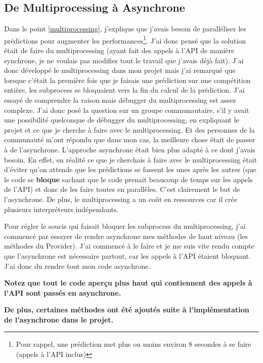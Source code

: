 \documentclass[a4paper,14pt]{extarticle}
\begin{document}
{\subsection{De Multiprocessing à Asynchrone}
\label{multiprocessingToAsync}

Dans le point \ref{multiprocessing}, j'explique que j'avais besoin de paralléliser les prédictions pour augmenter les performances\footnote{Pour rappel, une prédiction met plus ou moins environ 8 secondes à se faire (appels à l'API inclus) }. J'ai donc pensé que la solution était de faire du multiprocessing (ayant fait des appels à l'API de manière synchrone, je ne voulais pas modifier tout le travail que j'avais déjà fait). J'ai donc développé le multiprocessing dans mon projet mais j'ai remarqué que lorsque c'était la première fois que je faisais une prédiction sur une compétition entière, les subprocess se bloquaient vers la fin du calcul de la prédiction. J'ai essayé de comprendre la raison mais débugger du multiprocessing est assez complexe. J'ai donc posé la question sur un groupe communautaire, s'il y avait une possibilité quelconque de débugger du multiprocessing, en expliquant le projet et ce que je cherche à faire avec le multiprocessing. Et des personnes de la communauté m'ont répondu que dans mon cas, la meilleure chose était de passer à de l'asynchrone. L'approche asynchrone était bien plus adapté à ce dont j'avais besoin. En effet, en réalité ce que je cherchais à faire avec le multiprocessing était d'éviter qu'on attende que les prédictions se fassent les unes après les autres (que le code se \textbf{bloque} sachant que le code prenait beaucoup de temps sur les appels de l'API) et donc de les faire toutes en parallèles. C'est clairement le but de l'asynchrone. De plus, le multiprocessing a un coût en ressources car il crée plusieurs interpréteurs indépendants.

Pour régler le soucis qui faisait bloquer les subprocess du multiprocessing, j'ai commencé par essayer de rendre asynchrone mes méthodes de haut niveau (les méthodes du Provider). J'ai commencé à le faire et je me suis vite rendu compte que l'asynchrone est nécessaire partout, car les appels à l'API étaient bloquant. J'ai donc du rendre tout mon code asynchrone. 

\textbf{Notez que tout le code aperçu plus haut qui contiennent des appels à l'API sont passés en asynchrone.}

\textbf{De plus, certaines méthodes ont été ajoutés suite à l'implémentation de l'asynchrone dans le projet.}

}
\end{document}
